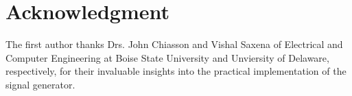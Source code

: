 \section{Acknowledgment}

The first author thanks Drs. John Chiasson and Vishal Saxena of Electrical and
Computer Engineering at Boise State University and Unviersity of Delaware,
respectively, for their invaluable insights into the practical implementation of
the signal generator.
